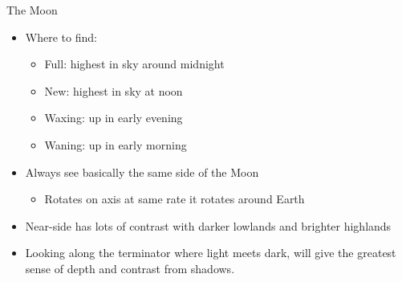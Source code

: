 \documentclass[pdf, ]{beamer}
\begin{document}
\begin{frame}{The Moon}
	\begin{itemize}
		\item Where to find:
			\begin{itemize}
				\item Full: highest in sky around midnight
				\item New: highest in sky at noon
				\item Waxing: up in early evening
				\item Waning: up in early morning
			\end{itemize}
		\item Always see basically the same side of the Moon
			\begin{itemize}
				\item Rotates on axis at same rate it rotates around Earth
			\end{itemize}
		\item Near-side has lots of contrast with darker lowlands and brighter highlands
		\item Looking along the \alert{terminator} where light meets dark, will give the greatest sense of depth and contrast from shadows.
	\end{itemize}
\end{frame}
\end{document}
